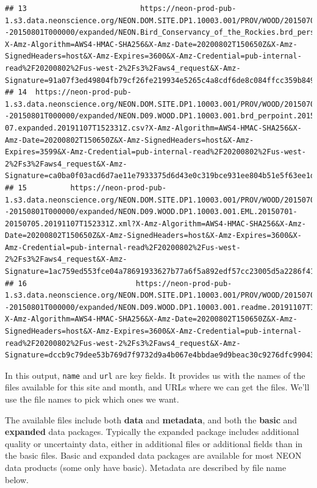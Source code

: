 \documentclass[]{book}
\begin{document}
\begin{verbatim}
## 13                          https://neon-prod-pub-1.s3.data.neonscience.org/NEON.DOM.SITE.DP1.10003.001/PROV/WOOD/20150701T000000--20150801T000000/expanded/NEON.Bird_Conservancy_of_the_Rockies.brd_personnel.csv?X-Amz-Algorithm=AWS4-HMAC-SHA256&X-Amz-Date=20200802T150650Z&X-Amz-SignedHeaders=host&X-Amz-Expires=3600&X-Amz-Credential=pub-internal-read%2F20200802%2Fus-west-2%2Fs3%2Faws4_request&X-Amz-Signature=91a07f3ed49804fb79cf26fe219934e5265c4a8cdf6de8c084ffcc359b849179
## 14  https://neon-prod-pub-1.s3.data.neonscience.org/NEON.DOM.SITE.DP1.10003.001/PROV/WOOD/20150701T000000--20150801T000000/expanded/NEON.D09.WOOD.DP1.10003.001.brd_perpoint.2015-07.expanded.20191107T152331Z.csv?X-Amz-Algorithm=AWS4-HMAC-SHA256&X-Amz-Date=20200802T150650Z&X-Amz-SignedHeaders=host&X-Amz-Expires=3599&X-Amz-Credential=pub-internal-read%2F20200802%2Fus-west-2%2Fs3%2Faws4_request&X-Amz-Signature=ca0ba0f03acd6d7ae11e7933375d6d43e0c319bce931ee804b51e5f63ee1d318
## 15          https://neon-prod-pub-1.s3.data.neonscience.org/NEON.DOM.SITE.DP1.10003.001/PROV/WOOD/20150701T000000--20150801T000000/expanded/NEON.D09.WOOD.DP1.10003.001.EML.20150701-20150705.20191107T152331Z.xml?X-Amz-Algorithm=AWS4-HMAC-SHA256&X-Amz-Date=20200802T150650Z&X-Amz-SignedHeaders=host&X-Amz-Expires=3600&X-Amz-Credential=pub-internal-read%2F20200802%2Fus-west-2%2Fs3%2Faws4_request&X-Amz-Signature=1ac759ed553fce04a78691933627b77a6f5a892edf57cc23005d5a2286f4173e
## 16                         https://neon-prod-pub-1.s3.data.neonscience.org/NEON.DOM.SITE.DP1.10003.001/PROV/WOOD/20150701T000000--20150801T000000/expanded/NEON.D09.WOOD.DP1.10003.001.readme.20191107T152331Z.txt?X-Amz-Algorithm=AWS4-HMAC-SHA256&X-Amz-Date=20200802T150650Z&X-Amz-SignedHeaders=host&X-Amz-Expires=3600&X-Amz-Credential=pub-internal-read%2F20200802%2Fus-west-2%2Fs3%2Faws4_request&X-Amz-Signature=dccb9c79dee53b769d7f9732d9a4b067e4bbdae9d9beac30c9276dfc99043f13
\end{verbatim}

In this output, \texttt{name} and \texttt{url} are key fields. It provides us with the names
of the files available for this site and month, and URLs where we can get the
files. We'll use the file names to pick which ones we want.

The available files include both \textbf{data} and \textbf{metadata}, and both the \textbf{basic}
and \textbf{expanded} data packages. Typically the expanded package includes additional
quality or uncertainty data, either in additional files or additional fields
than in the basic files. Basic and expanded data packages are available for
most NEON data products (some only have basic). Metadata are described by file
name below.
\end{document}
